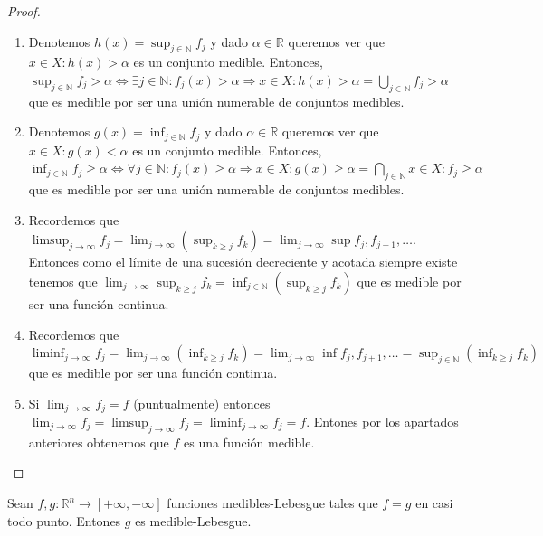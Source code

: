 \begin{proof}
    \begin{enumerate}
        \item Denotemos $h(x) = \sup_{j \in \mathbb{N}}{f_j}$ y dado $\alpha \in \mathbb{R}$
              queremos ver que ${x \in X : h(x) > \alpha}$ es un conjunto medible. Entonces,
              $\sup_{j \in \mathbb{N}}{f_j > \alpha} \iff \exists j \in \mathbb{N} : f_j(x) >
                  \alpha \Rightarrow {x \in X : h(x) > \alpha} = \bigcup_{j \in \mathbb{N}}{f_j >
                      \alpha}$ que es medible por ser una unión numerable de conjuntos medibles.
        \item Denotemos $g(x) = \inf_{j \in \mathbb{N}}{f_j}$ y dado $\alpha \in \mathbb{R}$
              queremos ver que ${x \in X : g(x) < \alpha}$ es un conjunto medible. Entonces,
              $\inf_{j \in \mathbb{N}}{f_j \geq \alpha} \iff \forall j \in \mathbb{N} :
                  f_j(x) \geq \alpha \Rightarrow {x \in X : g(x) \geq \alpha} = \bigcap_{j \in
                      \mathbb{N}}{x \in X : f_j \geq \alpha}$ que es medible por ser una unión
              numerable de conjuntos medibles.
        \item Recordemos que $\limsup_{j \to \infty}f_j = \lim_{j \to \infty}(\sup_{k \geq
                      j}f_k) = \lim_{j \to \infty}{\sup{f_j, f_{j+1}, \dots}}$. Entonces como el
              límite de una sucesión decreciente y acotada siempre existe tenemos que
              $\lim_{j \to \infty}{\sup_{k \geq j}f_k} = \inf_{j \in \mathbb{N}}{(\sup_{k
                          \geq j}f_k)}$ que es medible por ser una función continua.
        \item Recordemos que $\liminf_{j \to \infty}f_j = \lim_{j \to \infty}(\inf_{k \geq
                      j}f_k) = \lim_{j \to \infty}{\inf{f_j, f_{j+1}, \dots}} = \sup_{j \in
                      \mathbb{N}}{(\inf_{k \geq j}f_k)}$ que es medible por ser una función continua.
        \item Si $\lim_{j \to \infty}f_j = f$ (puntualmente) entonces $\lim_{j \to \infty}f_j
                  = \limsup_{j \to \infty}f_j = \liminf_{j \to \infty}f_j = f$. Entones por los
              apartados anteriores obtenemos que $f$ es una función medible.
    \end{enumerate}
\end{proof}

\begin{proposición}
Sean $f, g: \mathbb{R}^n \to [+\infty, -\infty]$ funciones medibles-Lebesgue tales que $f = g$ en casi todo punto. Entones $g$ es medible-Lebesgue.
\end{proposición}

